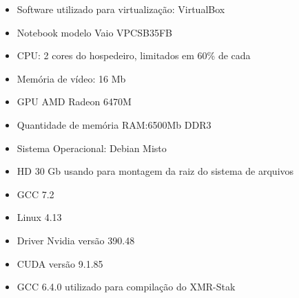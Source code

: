 \begin{itemize}
\begin{itemize}
	\item Software utilizado para virtualização: VirtualBox
	\item Notebook modelo Vaio VPCSB35FB
	\item \acrshort{CPU}: 2 cores do hospedeiro, limitados em 60\% de cada
	\item Memória de vídeo: 16 Mb
	\item \acrshort{GPU} AMD Radeon 6470M
	\item Quantidade de memória \acrshort{RAM}:6500Mb DDR3
	\item Sistema Operacional: Debian Misto
	\item HD 30 Gb usando para montagem da raiz do sistema de arquivos 
	\item GCC 7.2
	\item Linux 4.13
	\item Driver Nvidia versão 390.48
	\item CUDA versão 9.1.85
	\item GCC 6.4.0 utilizado para compilação do XMR-Stak
\end{itemize}

\end{itemize}
